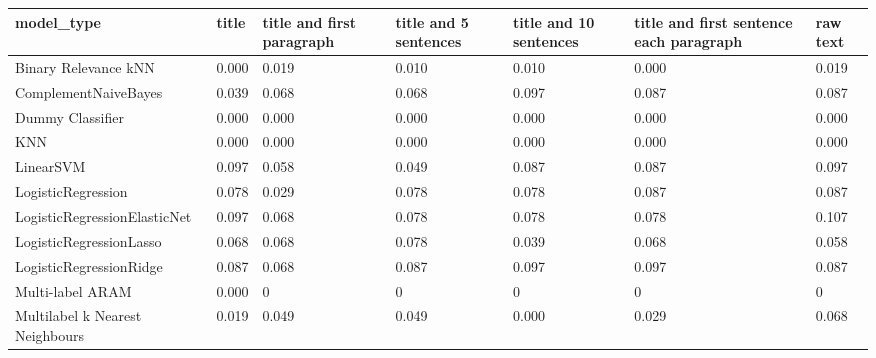 \begin{tabular}{lllllll}
\toprule
                     model\_type & title & title and first paragraph & title and 5 sentences & title and 10 sentences & title and first sentence each paragraph &  raw text \\
\midrule
           Binary Relevance kNN & 0.000 &                     0.019 &                 0.010 &                  0.010 &                                   0.000 &     0.019 \\
           ComplementNaiveBayes & 0.039 &                     0.068 &                 0.068 &                  0.097 &                                   0.087 &     0.087 \\
               Dummy Classifier & 0.000 &                     0.000 &                 0.000 &                  0.000 &                                   0.000 &     0.000 \\
                            KNN & 0.000 &                     0.000 &                 0.000 &                  0.000 &                                   0.000 &     0.000 \\
                      LinearSVM & 0.097 &                     0.058 &                 0.049 &                  0.087 &                                   0.087 &     0.097 \\
             LogisticRegression & 0.078 &                     0.029 &                 0.078 &                  0.078 &                                   0.087 &     0.087 \\
   LogisticRegressionElasticNet & 0.097 &                     0.068 &                 0.078 &                  0.078 &                                   0.078 &     0.107 \\
        LogisticRegressionLasso & 0.068 &                     0.068 &                 0.078 &                  0.039 &                                   0.068 &     0.058 \\
        LogisticRegressionRidge & 0.087 &                     0.068 &                 0.087 &                  0.097 &                                   0.097 &     0.087 \\
               Multi-label ARAM & 0.000 &                         0 &                     0 &                      0 &                                       0 &         0 \\
Multilabel k Nearest Neighbours & 0.019 &                     0.049 &                 0.049 &                  0.000 &                                   0.029 &     0.068 \\

\end{tabular}
